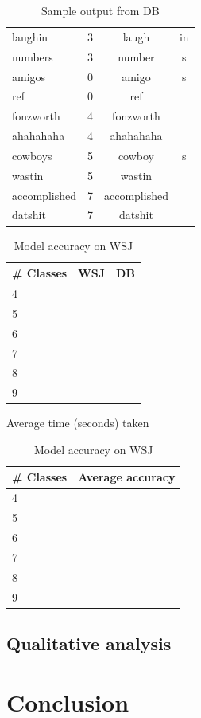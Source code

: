 \documentclass{article}
\begin{document}
\begin{table}[ht]
\begin{minipage}[b]{0.5\linewidth}
\begin{tabular}{lccc}
laughin & 3 & laugh & in \\
numbers & 3 & number & s \\
amigos & 0 & amigo & s \\ 
ref & 0 & ref & \\
fonzworth & 4 & fonzworth & \\
ahahahaha & 4 & ahahahaha & \\
cowboys & 5 & cowboy & s \\
wastin & 5 & wastin & \\
accomplished & 7 & accomplished & \\
datshit & 7 & datshit & \\
\hline
 \end{tabular}
\caption{\label{outputDB} Sample output from DB}
\end{minipage}
\end{table}

\begin{table}[ht]
\begin{minipage}[b]{0.5\linewidth}\centering
 \begin{tabular}{lcc}
  \hline
  \# Classes & WSJ & DB \\
  \hline
  4 & & \\
  5 & & \\
  6 & & \\
  7 & & \\
  8 & & \\
  9 & & \\
  \hline
 \end{tabular}
\caption{\label{timeTable}Average time (seconds) taken}
\end{minipage}
\begin{minipage}[b]{0.5\linewidth}\centering
 \begin{tabular}{lc}
  \hline
  \# Classes & Average accuracy \\
  \hline
  4 & \\
  5 & \\
  6 & \\
  7 & \\
  8 & \\
  9 & \\
  \hline
 \end{tabular}
\caption{\label{accuTable}Model accuracy on WSJ}
\end{minipage}
\end{table}

\subsection{Qualitative analysis}

\section{Conclusion}
\label{sec:conclusion}



\end{document}
